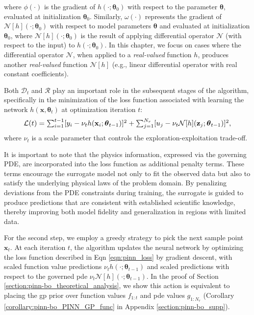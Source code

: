 where $\phi(\cdot)$ is the gradient of $h(\cdot; \boldsymbol{\theta}_0)$ with respect to the parameter $\boldsymbol{\theta}$, evaluated at initialization $\boldsymbol{\theta}_0$. Similarly, $\omega(\cdot)$ represents the gradient of $\mathcal{N}[h](\cdot; \boldsymbol{\theta}_0)$ with respect to model parameters $\boldsymbol{\theta}$ and evaluated at initialization $\boldsymbol{\theta}_0$, where $\mathcal{N}[h](\cdot; \boldsymbol{\theta}_0)$ is the result of applying differential operator $\mathcal{N}$ (with respect to the input) to $h(\cdot; \boldsymbol{\theta}_0)$. In this chapter, we focus on cases where the differential operator \( \mathcal{N} \), when applied to a \textit{real-valued} function \( h \), produces another \textit{real-valued} function \( \mathcal{N}[h] \) (e.g., linear differential operator with real constant coefficients). 

Both $\mathcal{D}_t$ and $\mathcal{R}$ play an important role in the subsequent stages of the algorithm, specifically in the minimization of the loss function associated with learning the network $h(\mathbf{x}, \boldsymbol{\theta}_t)$ at optimization iteration $t$:
\begin{equation}
    \label{eqn:pinn_loss}
    \resizebox{0.9\textwidth}{!}{
$\mathcal{L}(t) = \sum^{t-1}_{i=1} [y_i - \nu_t h(\mathbf{x}_i; \boldsymbol{\theta}_{t-1})]^2 + \sum^{N_r}_{j=1}[u_j - \nu_t \mathcal{N}[h](\mathbf{z}_j; \boldsymbol{\theta}_{t-1})]^2$,
}
\end{equation}
where $\nu_t$ is a scale parameter that controls the exploration-exploitation trade-off. 

It is important to note that the physics information, expressed via the governing PDE, are incorporated into the loss function as additional penalty terms. These terms encourage the surrogate model not only to fit the observed data but also to satisfy the underlying physical laws of the problem domain. By penalizing deviations from the PDE constraints during training, the surrogate is guided to produce predictions that are consistent with established scientific knowledge, thereby improving both model fidelity and generalization in regions with limited data.

For the second step, we employ a greedy strategy to pick the next sample point $\mathbf{x}_t$. At each iteration $t$, the algorithm updates the neural network by optimizing the loss function described in Eqn \ref{eqn:pinn_loss} by gradient descent, with scaled function value predictions $\nu_t h(\cdot; \boldsymbol{\theta}_{t-1})$ and scaled predictions with respect to the governed \ac{pde} $\nu_t \mathcal{N}[h](\cdot; \boldsymbol{\theta}_{t-1})$. In the proof of Section \ref{section:pinn-bo_theoretical_analysis}, we show this action is equivalent to placing the \ac{gp} prior over function values $f_{1:t}$ and \ac{pde} values $g_{1:N_r}$ (Corollary \ref{corollary:pinn-bo_PINN_GP_func} in Appendix \ref{section:pinn-bo_supp}). 

